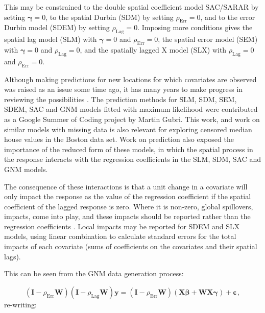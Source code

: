 \documentclass[]{book}
\begin{document}
This may be constrained to the double spatial coefficient model SAC/SARAR by setting \({\mathbf \gamma} = 0\), to the spatial Durbin (SDM) by setting \(\rho_{\mathrm{Err}} = 0\), and to the error Durbin model (SDEM) by setting \(\rho_{\mathrm{Lag}} = 0\). Imposing more conditions gives the spatial lag model (SLM) with \({\mathbf \gamma} = 0\) and \(\rho_{\mathrm{Err}} = 0\), the spatial error model (SEM) with \({\mathbf \gamma} = 0\) and \(\rho_{\mathrm{Lag}} = 0\), and the spatially lagged X model (SLX) with \(\rho_{\mathrm{Lag}} = 0\) and \(\rho_{\mathrm{Err}} = 0\).

Although making predictions for new locations for which covariates are observed was raised as an issue some time ago, it has many years to make progress in reviewing the possibilities \citep{bivand:02, goulardetal:17, Laurent2021}. The prediction methods for SLM, SDM, SEM, SDEM, SAC and GNM models fitted with maximum likelihood were contributed as a Google Summer of Coding project by Martin Gubri. This work, and work on similar models with missing data \citep{suesse:18} is also relevant for exploring censored median house values in the Boston data set. Work on prediction also exposed the importance of the reduced form of these models, in which the spatial process in the response interacts with the regression coefficients in the SLM, SDM, SAC and GNM models.

The consequence of these interactions is that a unit change in a covariate will only impact the response as the value of the regression coefficient if the spatial coefficient of the lagged response is zero. Where it is non-zero, global spillovers, impacts, come into play, and these impacts should be reported rather than the regression coefficients \citep{lesage+pace:09, elhorst:10, bivand:12, lesage:14, halleck-vega+elhorst:15}. Local impacts may be reported for SDEM and SLX models, using linear combination to calculate standard errors for the total impacts of each covariate (sums of coefficients on the covariates and their spatial lags).

This can be seen from the GNM data generation process:

\[
({\mathbf I} - \rho_{\mathrm{Err}} {\mathbf W})({\mathbf I} - \rho_{\mathrm{Lag}} {\mathbf W}){\mathbf y} = ({\mathbf I} - \rho_{\mathrm{Err}} {\mathbf W})({\mathbf X}{\mathbf \beta} + {\mathbf W}{\mathbf X}{\mathbf \gamma}) + {\mathbf \varepsilon},
\]
re-writing:
\end{document}
